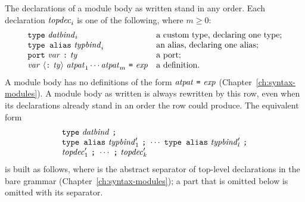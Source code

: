 The declarations of a module body as written stand in any order. Each
declaration $\mathit{topdec}_i$ is one of the following, where $m\geq 0$:
\[
  \begin{array}{ll}
    \textnormal{\texttt{type}}\ \mathit{datbind}_i & \text{a custom type, declaring one type;}\\
    \textnormal{\texttt{type alias}}\ \mathit{typbind}_i & \text{an alias, declaring one alias;}\\
    \textnormal{\texttt{port}}\ \mathit{var}\ \textnormal{\texttt{:}}\ \mathit{ty} & \text{a port;}\\
    \mathit{var}\ \langle \textnormal{\texttt{:}}\ \mathit{ty}\rangle\ \mathit{atpat}_1\cdots\mathit{atpat}_m\ \textnormal{\texttt{=}}\ \mathit{exp}
      & \text{a definition.}
  \end{array}
\] A module body has no definitions of the form
$\mathit{atpat}\ \textnormal{\texttt{=}}\ \mathit{exp}$ (Chapter~\ref{ch:syntax-modules}). A module body as
written is always rewritten by this row, even when its declarations already
stand in an order the row could produce. The equivalent form
\[
  \begin{array}{l}
    \textnormal{\texttt{type}}\ \mathit{datbind}\ \textnormal{\texttt{;}}\\
    \textnormal{\texttt{type alias}}\ \mathit{typbind}'_1\ \textnormal{\texttt{;}}\ \cdots\
      \textnormal{\texttt{type alias}}\ \mathit{typbind}'_l\ \textnormal{\texttt{;}}\\
    \mathit{topdec}'_1\ \textnormal{\texttt{;}}\ \cdots\ \textnormal{\texttt{;}}\ \mathit{topdec}'_k
  \end{array}
\]
is built as follows, where \kw{;} is the abstract separator of top-level
declarations in the bare grammar (Chapter~\ref{ch:syntax-modules}); a part
that is omitted below is omitted with its separator.

